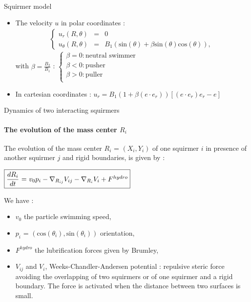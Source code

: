 \documentclass{beamer}
\begin{document}
\begin{frame}{Squirmer model}
\begin{center}
\begin{tikzpicture}
           
        \end{tikzpicture}
        \end{center}
    \begin{itemize}
        \item The velocity $u$ in polar coordinates \cite{Lauga} : \begin{align*}
       \left\{\begin{array}{rcl}
          u_r(R,\theta) &=& 0 \\
          u_\theta(R,\theta) &=& B_1(\mathrm{sin}(\theta) + \beta \mathrm{sin}(\theta)\mathrm{cos}(\theta)),
       \end{array}\right.\;
        \end{align*} with $\beta=\frac{B_2}{B_1}$ :
    $\left\{
        \begin{array}{ll}
            \beta = 0 : \text{neutral swimmer}  \\
            \beta < 0 : \mathrm{pusher} \\
            \beta > 0 : \mathrm{puller} \\
        \end{array}
    \right.$
        \item In  cartesian coordinates :
        $u_r = B_1(1+\beta (e\cdot e_r)) [(e\cdot e_r)e_r - e]$
    \end{itemize}
\end{frame}
    
\begin{frame}{Dynamics of two interacting squirmers}
        \framesubtitle{The evolution of the mass center $R_i$}
        The evolution of the mass center $R_i$ = $(X_i, Y_i)$ of one squirmer $i$ in presence of 
    another squirmer $j$ and rigid boundaries, is given by :
    \begin{center}
    $\boxed{\frac{dR_i}{dt}$ = $v_0 p_i -  \nabla_{R_{ij}} V_{ij} - \nabla_{R_i} V_i + F^{hydro}}$
    \end{center}
    We have : \begin{itemize}
        \item $v_0$ the particle swimming speed,
        \item $p_i$ = $(\mathrm{cos}(\theta_i),\mathrm{sin}(\theta_i))$ orientation,
        \item $F^{hydro}$ the lubrification forces given by Brumley\cite{Brumley},
        \item $V_{ij}$ and $V_i$, Weeks-Chandler-Andersen potential : repulsive steric force avoiding the overlapping of two squirmers or of one squirmer and a rigid boundary. The force is activated when the distance between two surfaces is small.
    \end{itemize}
\end{frame}
    
\end{document}
